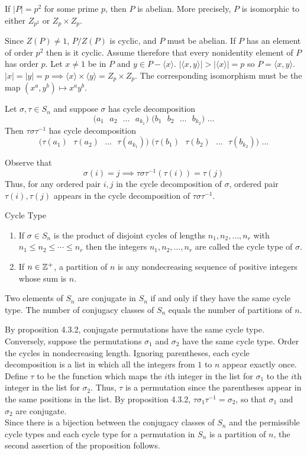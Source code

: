 \documentclass{report}
\newcommand{\cor}[2]{\begin{Corollary}{#1}{}#2\end{Corollary}}
\newcommand{\mprop}[2]{\begin{Prop}{#1}{}#2\end{Prop}}
\newcommand{\dfn}[2]{\begin{Definition}[colbacktitle=red!75!black]{#1}{}#2\end{Definition}}
\newenvironment{myproof}[1][\proofname]{%
	\proof[\bfseries #1: ]%
}{\endproof}
\begin{document}
\cor{}{If $|P| = p^2$ for some prime $p$, then $P$ is abelian. More precisely, $P$ is isomorphic to either $Z_{p^2}$ or $Z_p \times Z_p$. }
\begin{myproof}
    Since $Z(P) \neq 1$, $P/Z(P)$ is cyclic, and $P$ must be abelian. If $P$ has an element of order $p^2$ then is it cyclic. Assume therefore that every nonidentity element of $P$ has order $p$. Let $x \neq 1$ be in $P$ and $y \in P - \langle x \rangle$. $|\langle x, y \rangle | > | \langle x \rangle | = p$ so $P = \langle x, y \rangle$. $|x| = |y| = p \implies \langle x \rangle \times \langle y \rangle = Z_p \times Z_p$. The corresponding isomorphism must be the map $(x^a, y^b) \mapsto x^a y^b$. 
\end{myproof}
\mprop{}{Let $\sigma, \tau \in S_n$ and suppose $\sigma$ has cycle decomposition
$$\text{($a_1$ $a_2$ $\dots$ $a_{k_1}$)  ($b_1$ $b_2$ $\dots$ $b_{k_2}$) $\dots$}$$
Then $\tau \sigma \tau^{-1}$ has cycle decomposition
$$\text{($\tau(a_1)$ $\tau(a_2)$ $\dots$ $\tau(a_{k_1})$)  ($\tau(b_1)$ $\tau(b_2)$ $\dots$ $\tau(b_{k_2})$) $\dots$}$$}
\begin{myproof}
    Observe that
    $$\sigma(i) = j \implies \tau \sigma \tau^{-1}(\tau(i)) = \tau(j)$$
    Thus, for any ordered pair $i,j$ in the cycle decomposition of $\sigma$, ordered pair $\tau(i), \tau(j)$ appears in the cycle decomposition of $\tau \sigma \tau^{-1}$. 
\end{myproof}

\dfn{Cycle Type}{\begin{enumerate}
    \item If $\sigma \in S_n$ is the product of disjoint cycles of lengths $n_1, n_2, \dots , n_r$ with $n_1 \leq n_2 \leq \cdots \leq n_r$ then the integers $n_1, n_2, \dots , n_r$ are called the cycle type of $\sigma$.
    \item If $n \in \mathbb{Z}^+$, a partition of $n$ is any nondecreasing sequence of positive integers whose sum is $n$. 
\end{enumerate}}
\mprop{}{Two elements of $S_n$ are conjugate in $S_n$ if and only if they have the same cycle type. The number of conjugacy classes of $S_n$ equals the number of partitions of $n$.}
\begin{myproof}
    By proposition 4.3.2, conjugate permutations have the same cycle type. Conversely, suppose the permutations $\sigma_1$ and $\sigma_2$ have the same cycle type. Order the cycles in nondecreasing length. Ignoring parentheses, each cycle decomposition is a list in which all the integers from $1$ to $n$ appear exactly once. Define $\tau$ to be the function which maps the $i$th integer in the list for $\sigma_1$ to the $i$th integer in the list for $\sigma_2$. Thus, $\tau$ is a permutation since the parentheses appear in the same positions in the list. By proposition 4.3.2, $\tau \sigma_1 \tau^{-1} = \sigma_2$, so that $\sigma_1$ and $\sigma_2$ are conjugate. \\
    Since there is a bijection between the conjugacy classes of $S_n$ and the permissible cycle types and each cycle type for a permutation in $S_n$ is a partition of $n$, the second assertion of the proposition follows. 
\end{myproof}
\end{document}
